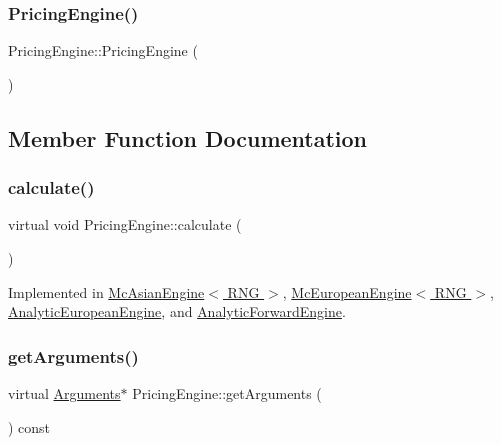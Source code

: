 \subsubsection{\texorpdfstring{Pricing\+Engine()}{PricingEngine()}}
{\footnotesize\ttfamily Pricing\+Engine\+::\+Pricing\+Engine (\begin{DoxyParamCaption}{ }\end{DoxyParamCaption})\hspace{0.3cm}{\ttfamily [inline]}}



\subsection{Member Function Documentation}
\hypertarget{class_pricing_engine_a733511ffc3cf5e4dc1fbc2a39208d8bd}{}\label{class_pricing_engine_a733511ffc3cf5e4dc1fbc2a39208d8bd} 
\subsubsection{\texorpdfstring{calculate()}{calculate()}}
{\footnotesize\ttfamily virtual void Pricing\+Engine\+::calculate (\begin{DoxyParamCaption}{ }\end{DoxyParamCaption})\hspace{0.3cm}{\ttfamily [pure virtual]}}



Implemented in \hyperlink{class_mc_asian_engine_ac16f4259846f55dc6c02d0b628f34e63}{Mc\+Asian\+Engine$<$ R\+N\+G $>$}, \hyperlink{class_mc_european_engine_a6c29ef7a7ba6cd1a2f93ee63070cf40e}{Mc\+European\+Engine$<$ R\+N\+G $>$}, \hyperlink{class_analytic_european_engine_adeda22c7b482779d7deaa17037195487}{Analytic\+European\+Engine}, and \hyperlink{class_analytic_forward_engine_a12d6791a13bf727d43ffcff9cb55b094}{Analytic\+Forward\+Engine}.

\hypertarget{class_pricing_engine_a399f4519f58b2ac1d108ce14d0058c97}{}\label{class_pricing_engine_a399f4519f58b2ac1d108ce14d0058c97} 
\subsubsection{\texorpdfstring{get\+Arguments()}{getArguments()}}
{\footnotesize\ttfamily virtual \hyperlink{class_pricing_engine_1_1_arguments}{Arguments}$\ast$ Pricing\+Engine\+::get\+Arguments (\begin{DoxyParamCaption}{ }\end{DoxyParamCaption}) const\hspace{0.3cm}{\ttfamily [pure virtual]}}



